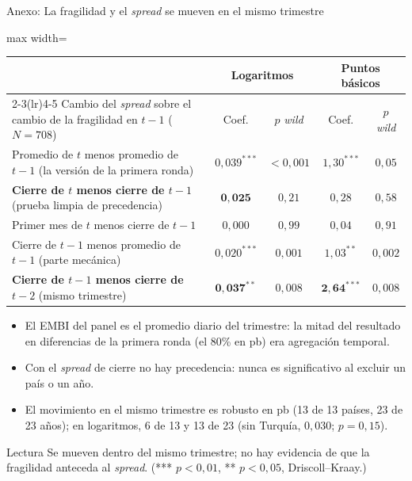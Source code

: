 \documentclass[aspectratio=169]{beamer}
\begin{document}
\begin{frame}{Anexo: La fragilidad y el \textit{spread} se mueven en el mismo trimestre}
\centering
\footnotesize
\begin{adjustbox}{max width=\textwidth}
\begin{tabular}{l cc cc}
\toprule
 & \multicolumn{2}{c}{Logaritmos} & \multicolumn{2}{c}{Puntos básicos} \\
\cmidrule(lr){2-3}\cmidrule(lr){4-5}
Cambio del \textit{spread} sobre el cambio de la fragilidad en $t-1$ ($N=708$) & Coef. & $p$ \textit{wild} & Coef. & $p$ \textit{wild} \\
\midrule
Promedio de $t$ menos promedio de $t-1$ (la versión de la primera ronda) & $0{,}039^{***}$ & $<0{,}001$ & $1{,}30^{***}$ & $0{,}05$ \\
\textbf{Cierre de $t$ menos cierre de $t-1$} (prueba limpia de precedencia) & $\mathbf{0{,}025}$ & $0{,}21$ & $0{,}28$ & $0{,}58$ \\
Primer mes de $t$ menos cierre de $t-1$ & $0{,}000$ & $0{,}99$ & $0{,}04$ & $0{,}91$ \\
Cierre de $t-1$ menos promedio de $t-1$ (parte mecánica) & $0{,}020^{***}$ & $0{,}001$ & $1{,}03^{**}$ & $0{,}002$ \\
\textbf{Cierre de $t-1$ menos cierre de $t-2$} (mismo trimestre) & $\mathbf{0{,}037^{**}}$ & $0{,}008$ & $\mathbf{2{,}64^{***}}$ & $0{,}008$ \\
\bottomrule
\end{tabular}
\end{adjustbox}
\vspace{1pt}
\begin{itemize}\footnotesize\setlength\itemsep{0pt}
\item El EMBI del panel es el promedio diario del trimestre: la mitad del resultado en diferencias de la primera ronda (el 80\% en pb) era agregación temporal.
\item Con el \textit{spread} de cierre no hay precedencia: nunca es significativo al excluir un país o un año.
\item El movimiento en el mismo trimestre es robusto en pb (13 de 13 países, 23 de 23 años); en logaritmos, 6 de 13 y 13 de 23 (sin Turquía, $0{,}030$; $p=0{,}15$).
\end{itemize}
\vspace{-8pt}
\begin{alertblock}{Lectura}
\footnotesize Se mueven dentro del mismo trimestre; no hay evidencia de que la fragilidad anteceda al \textit{spread}. {\scriptsize (*** $p<0{,}01$, ** $p<0{,}05$, Driscoll--Kraay.)}
\end{alertblock}
\end{frame}
\end{document}
